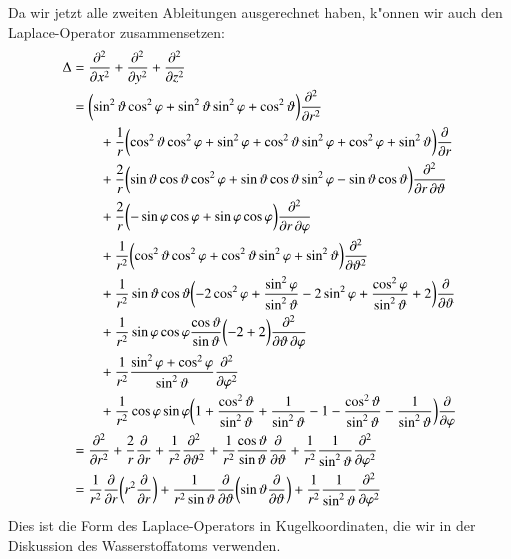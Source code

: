 Da wir jetzt alle zweiten Ableitungen ausgerechnet haben, k"onnen wir auch
den Laplace-Operator zusammensetzen:
\begin{align}
\Delta
&=
\frac{\partial^2}{\partial x^2}+
\frac{\partial^2}{\partial y^2}+
\frac{\partial^2}{\partial z^2}
\notag
\\
&=
\biggl(
\sin^2\vartheta\cos^2\varphi
+
\sin^2\vartheta\sin^2\varphi
+
\cos^2\vartheta
\biggr)
\frac{\partial^2}{\partial r^2}
\notag
\\
&\qquad
+
\frac1r\biggl(
\cos^2\vartheta\cos^2\varphi+\sin^2\varphi
+
\cos^2\vartheta\sin^2\varphi +\cos^2\varphi
+
\sin^2\vartheta
\biggr)
\frac{\partial}{\partial r}
\notag
\\
&\qquad
+
\frac2r\biggl(
\sin\vartheta\cos\vartheta\cos^2\varphi
+
\sin\vartheta\cos\vartheta\sin^2\varphi
-\sin\vartheta\cos\vartheta
\biggr)
\frac{\partial^2}{\partial r\,\partial\vartheta}
\notag
\\
&\qquad
+
\frac{2}{r}
\biggl(
-\sin\varphi\cos\varphi
+ \sin\varphi\cos\varphi
\biggr)
\frac{\partial^2}{\partial r\,\partial\varphi}
\notag
\\
&\qquad
+
\frac1{r^2}
\biggl(
\cos^2\vartheta\cos^2\varphi
+\cos^2\vartheta\sin^2\varphi
+\sin^2\vartheta
\biggr)
\frac{\partial^2}{\partial\vartheta^2}
\notag
\\
&\qquad
+
\frac1{r^2}
\sin\vartheta\cos\vartheta
\biggl(
-2 \cos^2\varphi
	+\frac{\sin^2\varphi}{\sin^2\vartheta}
-2\sin^2\varphi
+\frac{\cos^2\varphi}{\sin^2\vartheta}
+
2
\biggr)
\frac{\partial}{\partial\vartheta}
\notag
\\
&\qquad
+
\frac1{r^2}\sin\varphi\cos\varphi\frac{\cos\vartheta}{\sin\vartheta}
\biggl(
-2+2
\biggr)
\frac{\partial^2}{\partial\vartheta\,\partial\varphi}
\notag
\\
&\qquad
+
\frac1{r^2}\frac{\sin^2\varphi+\cos^2\varphi}{\sin^2\vartheta}
\frac{\partial^2}{\partial\varphi^2}
\notag
\\
&\qquad
+
\frac1{r^2}\cos\varphi\sin\varphi
\biggl(
1+\frac{\cos^2\vartheta}{\sin^2\vartheta}+\frac1{\sin^2\vartheta}
-1-\frac{\cos^2\vartheta}{\sin^2\vartheta}-\frac1{\sin^2\vartheta}
\biggr)
\frac{\partial}{\partial\varphi}
\notag
\\
&=
\frac{\partial^2}{\partial r^2}
+\frac{2}{r}\frac{\partial}{\partial r}
+\frac1{r^2}
\frac{\partial^2}{\partial\vartheta^2}
+
\frac1{r^2}
\frac{\cos\vartheta}{\sin\vartheta}
\frac{\partial}{\partial\vartheta}
+
\frac1{r^2}\frac1{\sin^2\vartheta}\frac{\partial^2}{\partial\varphi^2}
\notag
\\
&=
\frac1{r^2}\frac{\partial}{\partial r}\biggl(
r^2\frac{\partial}{\partial r}
\biggr)
+\frac1{r^2\sin\vartheta}\frac{\partial}{\partial\vartheta}\biggl(
\sin\vartheta\frac{\partial}{\partial\vartheta}
\biggr)
+\frac1{r^2}\frac1{\sin^2\vartheta}\frac{\partial^2}{\partial\varphi^2}
\label{laplacekugel}
\end{align}
Dies ist die Form des Laplace-Operators in Kugelkoordinaten, die
wir in der Diskussion des Wasserstoffatoms verwenden.
